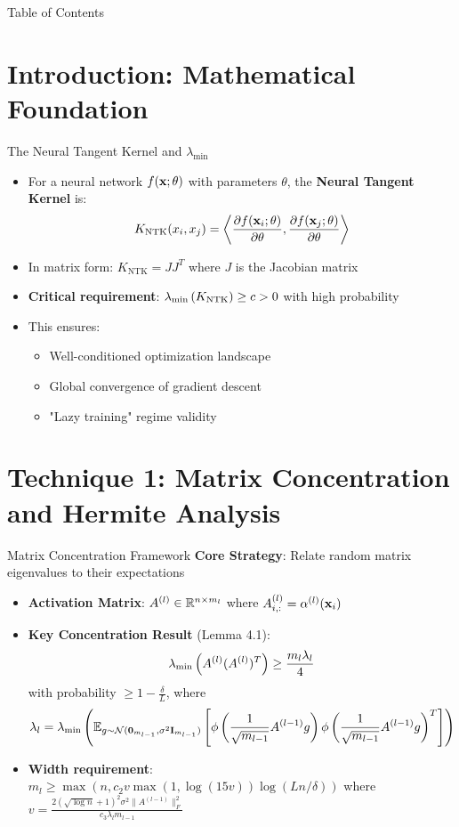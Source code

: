 \begin{frame}{Table of Contents}
  \tableofcontents
\end{frame}

\section{Introduction: Mathematical Foundation}
\begin{frame}{The Neural Tangent Kernel and $\lambda_{\min}$}
  \begin{itemize}[<+->]
    \item For a neural network $f(\mathbf{x}; \theta)$ with parameters $\theta$, the \textbf{Neural Tangent Kernel} is:
    $$K_{\text{NTK}}(x_i, x_j) = \left\langle \frac{\partial f(\mathbf{x}_i; \theta)}{\partial \theta}, \frac{\partial f(\mathbf{x}_j; \theta)}{\partial \theta} \right\rangle$$
    \item In matrix form: $K_{\text{NTK}} = JJ^T$ where $J$ is the Jacobian matrix
    \item \textbf{Critical requirement}: $\lambda_{\rm min}\left(K_{\text{NTK}}\right) \geq c > 0$ with high probability
    \item This ensures:
    \begin{itemize}
      \item Well-conditioned optimization landscape
      \item Global convergence of gradient descent
      \item "Lazy training" regime validity
    \end{itemize}
  \end{itemize}
\end{frame}

\section{Technique 1: Matrix Concentration and Hermite Analysis}

\begin{frame}{Matrix Concentration Framework}
  \textbf{Core Strategy}: Relate random matrix eigenvalues to their expectations
  \begin{itemize}[<+->]
    \item \textbf{Activation Matrix}: $A^{(l)} \in \mathbb{R}^{n \times m_l}$ where $A^{(l)}_{i,:} = \alpha^{(l)}(\mathbf{x}_i)$
    \item \textbf{Key Concentration Result} (Lemma 4.1):
    $$\lambda_{\rm min}\left(A^{(l)}(A^{(l)})^T\right) \geq \frac{m_l \lambda_l}{4}$$
    with probability $\geq 1 - \frac{\delta}{L}$, where
    $$\lambda_l = \lambda_{\rm min}\left(\mathbb{E}_{g \sim \mathcal{N}(\boldsymbol{0}_{m_{l-1}}, \sigma^2 \mathbf{I}_{m_{l-1}})} \left[ \phi\left(\frac{1}{\sqrt{m_{l-1}}} A^{(l-1)} g\right) \phi\left(\frac{1}{\sqrt{m_{l-1}}} A^{(l-1)} g\right)^T \right]\right)$$
    \item \textbf{Width requirement}: $m_l \geq \max\left(n, c_2 v \max(1, \log(15v)) \log(Ln/\delta)\right)$
    where $v = \frac{2(\sqrt{\log n}+1)^2 \sigma^2 \|A^{(l-1)}\|_F^2}{c_3 \lambda_l m_{l-1}}$
  \end{itemize}
\end{frame}

